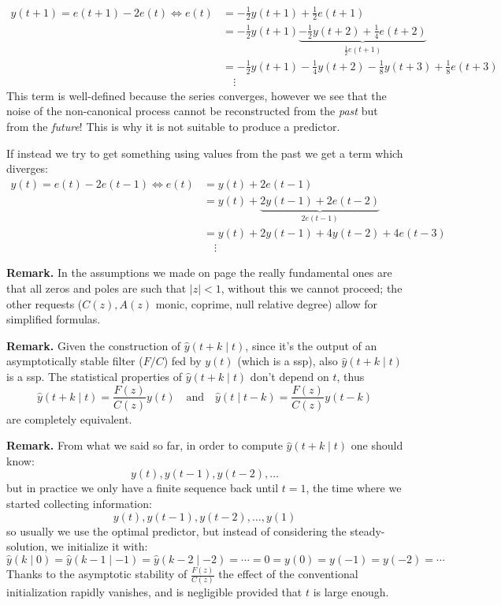 \begin{rem}
\begin{align*}
	y(t+1)=e(t+1)-2e(t) \iff e(t)&=-\frac{1}{2} y(t+1)+\frac{1}{2} e(t+1)\\
	&= -\frac{1}{2} y(t+1)\underbrace{-\frac{1}{2} y(t+2)+\frac{1}{4}e(t+2)}_{\frac{1}{2} e(t+1)}\\
	&= -\frac{1}{2} y(t+1)-\frac{1}{4}y(t+2)-\frac{1}{8}y(t+3)+\frac{1}{8}e(t+3)\\
	&\quad\vdots
\end{align*}
This term is well-defined because the series converges, however we see that the noise of the non-canonical process cannot be reconstructed from the \emph{past} but from the \emph{future}! This is why it is not suitable to produce a predictor.

If instead we try to get something using values from the past we get a term which diverges:
\begin{align*}
	y(t)=e(t)-2e(t-1) \iff e(t)&=y(t)+2e(t-1)\\
	&=y(t)+\underbrace{2y(t-1)+2e(t-2)}_{2e(t-1)}\\
	&=y(t)+2y(t-1)+4y(t-2)+4e(t-3)\\
	&\quad\vdots
\end{align*}
\end{rem}

\textbf{Remark.}
In the assumptions we made on page \pageref{assumptions-prediction-theory} the really fundamental ones are that all zeros and poles are such that $|z|<1$, without this we cannot proceed; the other requests ($C(z),A(z)$ monic, coprime, null relative degree) allow for simplified formulas.

\textbf{Remark.}
Given the construction of $\hat y(t+k\mid t)$, since it's the output of an asymptotically stable filter ($F/C$) fed by $y(t)$ (which is a \gls{ssp}), also $\hat y(t+k\mid t)$ is a \gls{ssp}. The statistical properties of $\hat y(t+k\mid t)$ don't depend on $t$, thus
\[
	\hat y(t+k\mid t) = \frac{F(z)}{C(z)}y(t) \quad \text{and} \quad \hat y(t\mid t-k) = \frac{F(z)}{C(z)}y(t-k)
\]
are completely equivalent.

\textbf{Remark.}
From what we said so far, in order to compute $\hat y(t+k\mid t)$ one should know:
\[
	y(t),y(t-1),y(t-2),\ldots
\]
but in practice we only have a finite sequence back until $t=1$, the time where we started collecting information:
\[
	y(t),y(t-1),y(t-2),\ldots,y(1)
\]
so usually we use the optimal predictor, but instead of considering the steady-solution, we initialize it with:
\[
	\boxed{\hat y(k\mid 0) = \hat y(k-1\mid -1) = \hat y(k-2\mid -2) = \cdots = 0 = y(0) = y(-1) = y(-2) = \cdots}
\]
Thanks to the asymptotic stability of $\frac{F(z)}{C(z)}$ the effect of the conventional initialization rapidly vanishes, and is negligible provided that $t$ is large enough.

